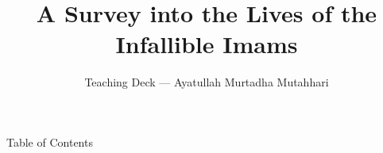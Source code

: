 \documentclass[11pt,aspectratio=169]{beamer}
\title{A Survey into the Lives of the Infallible Imams}
\subtitle{Teaching Deck --- Ayatullah Murtadha Mutahhari}
\author{\presentername}
\date{}
\begin{document}
\begin{frame}[plain]
  \titlepage
\end{frame}

\begin{frame}{Table of Contents}
  \tableofcontents
\end{frame}









\end{document}
